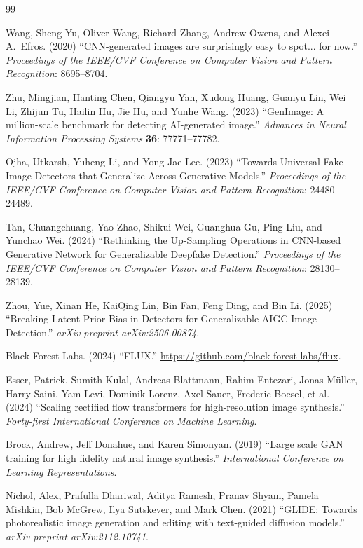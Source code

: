 \documentclass[3p,times,procedia]{elsarticle}
\begin{document}
\begin{thebibliography}{99}

Wang, Sheng-Yu, Oliver Wang, Richard Zhang, Andrew Owens, and Alexei A.\ Efros.
(2020) ``CNN-generated images are surprisingly easy to spot... for now.''
\textit{Proceedings of the IEEE/CVF Conference on Computer Vision and
Pattern Recognition}: 8695--8704.

Zhu, Mingjian, Hanting Chen, Qiangyu Yan, Xudong Huang, Guanyu Lin, Wei Li,
Zhijun Tu, Hailin Hu, Jie Hu, and Yunhe Wang. (2023) ``GenImage: A
million-scale benchmark for detecting AI-generated image.''
\textit{Advances in Neural Information Processing Systems} \textbf{36}:
77771--77782.

Ojha, Utkarsh, Yuheng Li, and Yong Jae Lee. (2023) ``Towards Universal Fake
Image Detectors that Generalize Across Generative Models.''
\textit{Proceedings of the IEEE/CVF Conference on Computer Vision and
Pattern Recognition}: 24480--24489.

Tan, Chuangchuang, Yao Zhao, Shikui Wei, Guanghua Gu, Ping Liu, and Yunchao
Wei. (2024) ``Rethinking the Up-Sampling Operations in CNN-based
Generative Network for Generalizable Deepfake Detection.''
\textit{Proceedings of the IEEE/CVF Conference on Computer Vision and
Pattern Recognition}: 28130--28139.

Zhou, Yue, Xinan He, KaiQing Lin, Bin Fan, Feng Ding, and Bin Li. (2025)
``Breaking Latent Prior Bias in Detectors for Generalizable AIGC Image
Detection.'' \textit{arXiv preprint arXiv:2506.00874}.

Black Forest Labs. (2024) ``FLUX.'' \url{https://github.com/black-forest-labs/flux}.

Esser, Patrick, Sumith Kulal, Andreas Blattmann, Rahim Entezari, Jonas
M\"{u}ller, Harry Saini, Yam Levi, Dominik Lorenz, Axel Sauer, Frederic
Boesel, et al. (2024) ``Scaling rectified flow transformers for
high-resolution image synthesis.'' \textit{Forty-first International
Conference on Machine Learning}.

Brock, Andrew, Jeff Donahue, and Karen Simonyan. (2019) ``Large scale GAN
training for high fidelity natural image synthesis.'' \textit{International
Conference on Learning Representations}.

Nichol, Alex, Prafulla Dhariwal, Aditya Ramesh, Pranav Shyam, Pamela
Mishkin, Bob McGrew, Ilya Sutskever, and Mark Chen. (2021) ``GLIDE:
Towards photorealistic image generation and editing with text-guided
diffusion models.'' \textit{arXiv preprint arXiv:2112.10741}.


\end{thebibliography}
\end{document}
